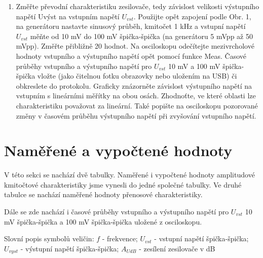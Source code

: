 \documentclass[a4paper, czech]{article}
\begin{document}
\begin{enumerate}
    \item Změřte převodní charakteristiku zesilovače, tedy závislost velikosti výstupního napětí Uvýst na vstupním napětí $U_{vst}$. Použijte opět zapojení podle Obr. 1, na generátoru nastavte sinusový průběh, kmitočet 1 kHz a vstupní napětí $U_{vst}$ měňte od 10 mV do 100 mV špička-špička (na generátoru 5 mVpp až 50 mVpp). Změřte přibližně 20 hodnot. Na osciloskopu odečítejte mezivrcholové hodnoty vstupního a výstupního napětí opět pomocí funkce Meas. Časové průběhy vstupního a výstupního napětí pro $U_{vst}$ 10 mV a 100 mV špička-špička vložte (jako čitelnou fotku obrazovky nebo uložením na USB) či obkreslete do protokolu. Graficky znázorněte závislost výstupního napětí na vstupním s lineárními měřítky na obou osách. Zhodnoťte, ve které oblasti lze charakteristiku považovat za lineární. Také popište na osciloskopu pozorované změny v časovém průběhu výstupního napětí při zvyšování vstupního napětí.
\end{enumerate}

\section{Naměřené a vypočtené hodnoty}

V této sekci se nachází dvě tabulky.
Naměřené i vypočtené hodnoty amplitudové kmitočtové charakteristiky jsme vynesli do jedné společné tabulky.
Ve druhé tabulce se nachází naměřené hodnoty přenosové charakteristiky.

Dále se zde nachází i časové průběhy vstupního a výstupního napětí pro $U_{vst}$ 10 mV špička-špička a 100 mV špička-špička uložené z osciloskopu.

Slovní popis symbolů veličin:
$f$ - frekvence;
$U_{vst}$ - vstupní napětí špička-špička;
$U_{vyst}$ - výstupní napětí špička-špička;
$A_{UdB}$ - zesílení zesilovače v dB
\end{document}
